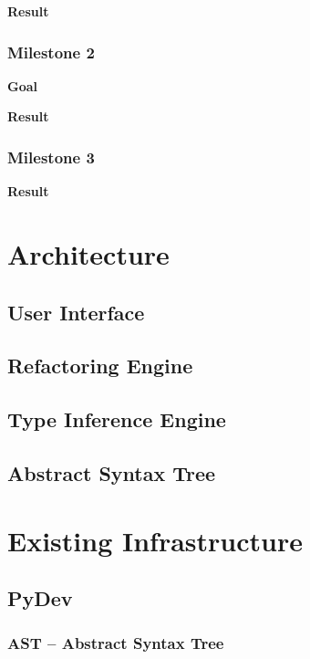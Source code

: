 \documentclass[12pt,halfparskip]{scrreprt}
\begin{document}
\textbf{Result}

\subsection{Milestone 2}

\textbf{Goal}

\textbf{Result}

\subsection{Milestone 3}

\textbf{Result}

\chapter{Architecture}


\section{User Interface}

\section{Refactoring Engine}

\section{Type Inference Engine}

\section{Abstract Syntax Tree}

\chapter{Existing Infrastructure}


\section{PyDev}

\subsection{AST – Abstract Syntax Tree}\label{ast}
\end{document}
